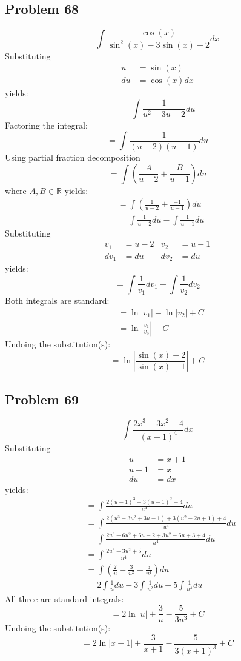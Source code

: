\documentclass{article}
\begin{document}
\subsection*{Problem 68}
$$\int\frac{\cos\left(x\right)}{\sin^2\left(x\right)-3\sin\left(x\right)+2}dx$$
Substituting
\begin{align*}
u&=\sin(x) \\
du&=\cos(x)dx
\end{align*}
yields:
$$=\int\frac{1}{u^2-3u+2}du$$
Factoring the integral:
$$=\int\frac{1}{(u-2)(u-1)}du$$
Using partial fraction decomposition
$$=\int\left(\frac{A}{u-2}+\frac{B}{u-1}\right)du$$
where $A,B\in\mathbb{R}$ yields:
\begin{align*}
&=\int\left(\frac{1}{u-2}+\frac{-1}{u-1}\right)du \\
&=\int\frac{1}{u-2}du-\int\frac{1}{u-1}du
\end{align*}
Substituting
\begin{align*}
v_1&=u-2 &v_2&=u-1 \\
dv_1&=du &dv_2&=du
\end{align*}
yields:
$$=\int\frac{1}{v_1}dv_1-\int\frac{1}{v_2}dv_2$$
Both integrals are standard:
\begin{align*}
&=\ln\left|v_1\right|-\ln\left|v_2\right|+C \\
&=\ln\left|\frac{v_1}{v_2}\right|+C
\end{align*}
Undoing the substitution(s):
$$=\ln\left|\frac{\sin(x)-2}{\sin(x)-1}\right|+C$$
\subsection*{Problem 69}
$$\int\frac{2x^3+3x^2+4}{\left(x+1\right)^4}dx$$
Substituting
\begin{align*}
u&=x+1 \\
u-1&=x \\
du&=dx
\end{align*}
yields:
\begin{align*}
&=\int\frac{2(u-1)^3+3(u-1)^2+4}{u^4}du \\
&=\int\frac{2(u^3-3u^2+3u-1)+3(u^2-2u+1)+4}{u^4}du \\
&=\int\frac{2u^3-6u^2+6u-2+3u^2-6u+3+4}{u^4}du \\
&=\int\frac{2u^3-3u^2+5}{u^4}du \\
&=\int\left(\frac{2}{u}-\frac{3}{u^2}+\frac{5}{u^4}\right)du \\
&=2\int\frac{1}{u}du-3\int\frac{1}{u^2}du+5\int\frac{1}{u^4}du
\end{align*}
All three are standard integrals:
$$=2\ln|u|+\frac{3}{u}-\frac{5}{3u^3}+C$$
Undoing the substitution(s):
$$=2\ln|x+1|+\frac{3}{x+1}-\frac{5}{3(x+1)^3}+C$$
\end{document}
